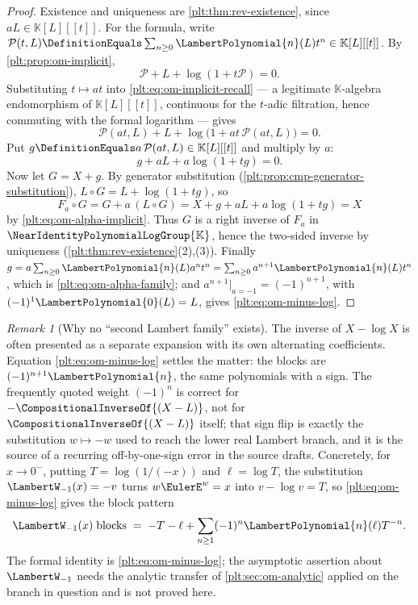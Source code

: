 \documentclass[11pt,oneside]{article}
\theoremstyle{plain}
\theoremstyle{definition}
\theoremstyle{remark}
\newtheorem{remark}[theorem]{Remark}
\newcommand{\K}{\mathbb{K}}
\newcommand{\Gnear}{\NearIdentityPolynomialLogGroup{\K}} %
\newcommand{\compose}{\mathbin{\circ}}
\newcommand{\rev}[1]{\CompositionalInverseOf{#1}}
\newcommand{\LamP}[1]{\LambertPolynomial{#1}}
\begin{document}
\begin{proof}
Existence and uniqueness are \cref{plt:thm:rev-existence}, since
\(aL\in\K[L][[t]]\).  For the formula, write
\(\mathcal P(t,L)\DefinitionEquals\sum_{n\ge0}\LamP{n}(L)t^{n}\in\K[L][[t]]\).
By \cref{plt:prop:om-implicit},
\begin{equation}\label{plt:eq:om-implicit-recall}
 \mathcal P+L+\log(1+t\mathcal P)=0 .
\end{equation}
Substituting \(t\mapsto at\) into \eqref{plt:eq:om-implicit-recall} --- a
legitimate \(\K\)-algebra endomorphism of \(\K[L][[t]]\), continuous for the
\(t\)-adic filtration, hence commuting with the formal logarithm --- gives
\[
 \mathcal P(at,L)+L+\log\bigl(1+at\,\mathcal P(at,L)\bigr)=0 .
\]
Put \(g\DefinitionEquals a\,\mathcal P(at,L)\in\K[L][[t]]\) and multiply by
\(a\):
\begin{equation}\label{plt:eq:om-alpha-implicit}
 g+aL+a\log(1+tg)=0 .
\end{equation}
Now let \(G=X+g\).  By generator substitution
(\cref{plt:prop:cmp-generator-substitution}), \(L\compose G=L+\log(1+tg)\),
so
\[
 F_a\compose G=G+a\,(L\compose G)=X+g+aL+a\log(1+tg)=X
\]
by \eqref{plt:eq:om-alpha-implicit}.  Thus \(G\) is a right inverse of
\(F_a\) in \(\Gnear\), hence the two-sided inverse by uniqueness
(\cref{plt:thm:rev-existence}(2),(3)).  Finally
\(g=a\sum_{n\ge0}\LamP{n}(L)a^{n}t^{n}=\sum_{n\ge0}a^{n+1}\LamP{n}(L)t^{n}\),
which is \eqref{plt:eq:om-alpha-family}; and
\(a^{n+1}\big|_{a=-1}=(-1)^{n+1}\), with
\((-1)^{1}\LamP{0}(L)=L\), gives \eqref{plt:eq:om-minus-log}.
\end{proof}

\begin{remark}[Why no ``second Lambert family'' exists]
\label{plt:rmk:om-second-family}
The inverse of \(X-\log X\) is often presented as a separate expansion with
its own alternating coefficients.  Equation \eqref{plt:eq:om-minus-log}
settles the matter: the blocks are \((-1)^{n+1}\LamP{n}\), the same
polynomials with a sign.  The frequently quoted weight \((-1)^{n}\) is
correct for \(-\rev{(X-L)}\), not for \(\rev{(X-L)}\) itself; that sign flip
is exactly the substitution \(w\mapsto-w\) used to reach the lower real
Lambert branch, and it is the source of a recurring off-by-one-sign error in
the source drafts.  Concretely, for \(x\to0^{-}\), putting
\(T=\log(1/(-x))\) and \(\ell=\log T\), the substitution
\(\LambertW_{-1}(x)=-v\) turns \(w\EulerE^{w}=x\) into \(v-\log v=T\), so
\eqref{plt:eq:om-minus-log} gives the block pattern
\[
 \LambertW_{-1}(x)\;\text{blocks}\;=\;-T-\ell+\sum_{n\ge1}(-1)^{n}\LamP{n}(\ell)T^{-n}.
\]
The formal identity is \eqref{plt:eq:om-minus-log}; the asymptotic assertion
about \(\LambertW_{-1}\) needs the analytic transfer of
\cref{plt:sec:om-analytic} applied on the branch in question and is not
proved here.
\end{remark}
\end{document}

